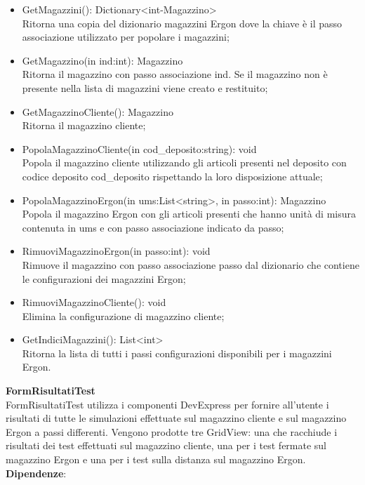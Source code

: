 \begin{itemize}
    \item GetMagazzini(): Dictionary<int-Magazzino>\\
    Ritorna una copia del dizionario magazzini Ergon dove la chiave è il passo associazione utilizzato per popolare i magazzini;
    \item GetMagazzino(in ind:int): Magazzino \\
    Ritorna il magazzino con passo associazione ind. Se il magazzino non è presente nella lista di magazzini viene creato e restituito;
    \item GetMagazzinoCliente(): Magazzino \\
    Ritorna il magazzino cliente;
    \item PopolaMagazzinoCliente(in cod\_deposito:string): void \\
    Popola il magazzino cliente utilizzando gli articoli presenti nel deposito con codice deposito cod\_deposito rispettando la loro disposizione attuale;
    \item PopolaMagazzinoErgon(in ums:List<string>, in passo:int): Magazzino \\
    Popola il magazzino Ergon con gli articoli presenti che hanno unità di misura contenuta in ums e con passo associazione indicato da passo;
    \item RimuoviMagazzinoErgon(in passo:int): void \\
    Rimuove il magazzino con passo associazione passo dal dizionario che contiene le configurazioni dei magazzini Ergon;
    \item RimuoviMagazzinoCliente(): void \\
    Elimina la configurazione di magazzino cliente;
    \item GetIndiciMagazzini(): List<int> \\
    Ritorna la lista di tutti i passi configurazioni disponibili per i magazzini Ergon.
\end{itemize} 
\textbf{FormRisultatiTest}\\
FormRisultatiTest utilizza i componenti DevExpress per fornire all'utente i risultati di tutte le simulazioni effettuate
sul magazzino cliente e sul magazzino Ergon a passi differenti.
Vengono prodotte tre GridView: una che racchiude i risultati dei test effettuati sul magazzino cliente, una per i test fermate sul magazzino 
Ergon e una per i test sulla distanza sul magazzino Ergon.
\textbf{Dipendenze}:
